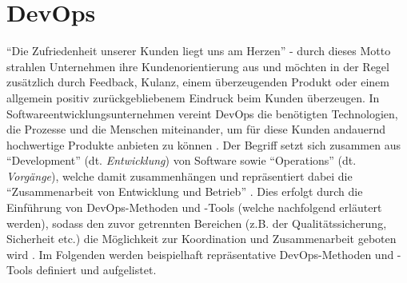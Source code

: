 \section{DevOps}
\enquote{Die Zufriedenheit unserer Kunden liegt uns am Herzen} - durch dieses Motto strahlen Unternehmen ihre Kundenorientierung aus und möchten in der Regel zusätzlich durch Feedback, Kulanz, einem überzeugenden Produkt
oder einem allgemein positiv zurückgebliebenem Eindruck beim Kunden überzeugen. In Softwareentwicklungsunternehmen vereint DevOps die benötigten Technologien, die Prozesse und die Menschen miteinander, um für diese Kunden 
andauernd hochwertige Produkte anbieten zu können \cite{MSAzure:2020aa}. \newline Der Begriff setzt sich zusammen aus \enquote{Development} (dt. \textit{Entwicklung}) von Software sowie \enquote{Operations} (dt. \textit{Vorgänge}), welche damit zusammenhängen 
\cite{MSAzure:2020aa} und repräsentiert dabei die \enquote{Zusammenarbeit von Entwicklung und Betrieb} \cite{Hasselbring:2015aa}. Dies erfolgt durch die Einführung von DevOps-Methoden und -Tools (welche nachfolgend erläutert werden), sodass den zuvor getrennten Bereichen (z.B. der Qualitätssicherung, Sicherheit etc.) die Möglichkeit zur Koordination und Zusammenarbeit geboten wird \cite{MSAzure:2020aa}. \newline Im Folgenden werden beispielhaft repräsentative DevOps-Methoden und -Tools definiert und aufgelistet.

